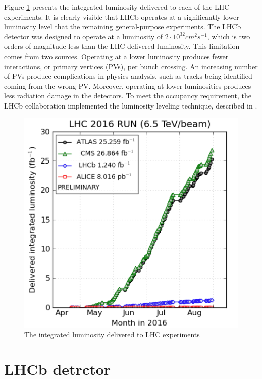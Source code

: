 Figure \ref{fig:Luminosity} presents the integrated luminosity delivered to each of the LHC experiments. It is clearly visible that LHCb operates at a significantly lower luminosity level that the remaining general-purpose experiments.  The LHCb detector was designed to operate at a luminosity of $2 \cdot 10^{32}cm^2s^{-1}$, which is two orders of magnitude less than the LHC delivered luminosity.  This limitation comes from two sources. Operating at a lower luminosity produces fewer interactions, or primary vertices (PVs), per bunch crossing. An increasing number of PVs produce complications in physics analysis, such as tracks being identified coming from the wrong PV.  Moreover, operating at lower luminosities produces less radiation damage in the detectors. To meet the occupancy requirement, the LHCb collaboration implemented the luminosity leveling technique, described in \cite{lumi_down}. 


\begin{figure}
\centering
\includegraphics[scale=0.5]{figures/Luminosity.png}
\caption[Luminosity]{The integrated luminosity delivered to LHC experiments
\label{fig:Luminosity}}
\end{figure}


\section{LHCb detrctor}


